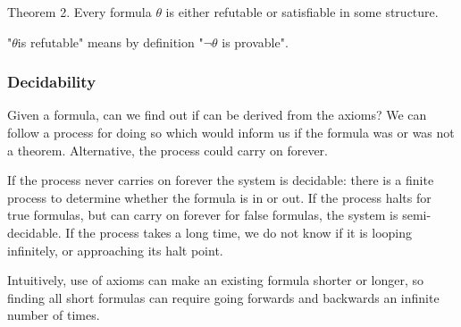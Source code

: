 Theorem 2. Every formula \(\theta \) is either refutable or satisfiable in some structure.

"\(\theta \)is refutable" means by definition "\(¬\theta \) is provable".

\subsubsection{Decidability}

Given a formula, can we find out if can be derived from the axioms? We can follow a process for doing so which would inform us if the formula was or was not a theorem. Alternative, the process could carry on forever.

If the process never carries on forever the system is decidable: there is a finite process to determine whether the formula is in or out. If the process halts for true formulas, but can carry on forever for false formulas, the system is semi-decidable. If the process takes a long time, we do not know if it is looping infinitely, or approaching its halt point.

Intuitively, use of axioms can make an existing formula shorter or longer, so finding all short formulas can require going forwards and backwards an infinite number of times.

